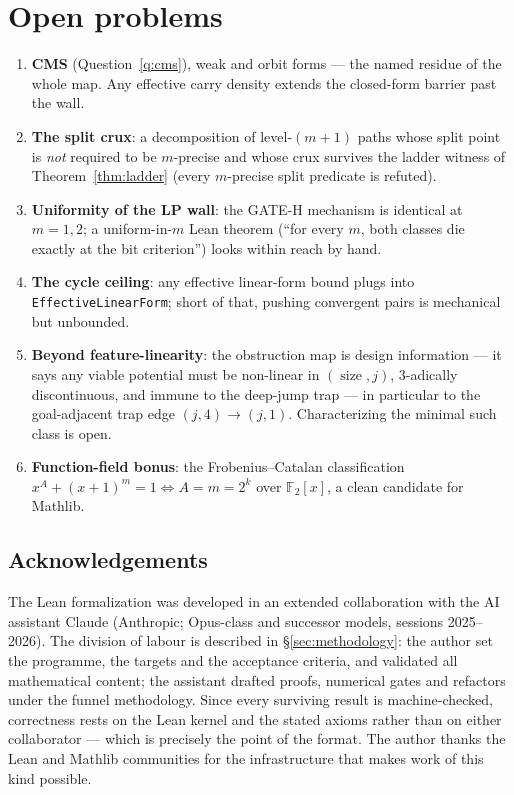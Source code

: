 \documentclass[11pt]{amsart}
\theoremstyle{definition}
\theoremstyle{remark}
\newcommand{\size}{\operatorname{size}}
\newcommand{\lean}[1]{{\def\_{\textunderscore\allowbreak}\texttt{#1}}}
\newcommand{\F}{\mathbb{F}}
\begin{document}
\section{Open problems}\label{sec:open}

\begin{enumerate}
\item \textbf{CMS} (Question~\ref{q:cms}), weak and orbit forms --- the
  named residue of the whole map.  Any effective carry density extends the
  closed-form barrier past the wall.
\item \textbf{The split crux}: a decomposition of level-$(m{+}1)$ paths
  whose split point is \emph{not} required to be $m$-precise and whose crux
  survives the ladder witness of Theorem~\ref{thm:ladder} (every
  $m$-precise split predicate is refuted).
\item \textbf{Uniformity of the LP wall}: the GATE-H mechanism is identical
  at $m=1,2$; a uniform-in-$m$ Lean theorem (``for every $m$, both classes
  die exactly at the bit criterion'') looks within reach by hand.
\item \textbf{The cycle ceiling}: any effective linear-form bound plugs into
  \lean{EffectiveLinearForm}; short of that, pushing convergent pairs is
  mechanical but unbounded.
\item \textbf{Beyond feature-linearity}: the obstruction map is design
  information --- it says any viable potential must be non-linear in
  $(\size, j)$, $3$-adically discontinuous, and immune to the deep-jump
  trap --- in particular to the goal-adjacent trap edge $(j,4)\to(j,1)$.
  Characterizing the minimal such class is open.
\item \textbf{Function-field bonus}: the Frobenius--Catalan classification
  $x^A + (x+1)^m = 1 \iff A = m = 2^k$ over $\F_2[x]$, a clean candidate for
  Mathlib.
\end{enumerate}

\subsection*{Acknowledgements}
The Lean formalization was developed in an extended collaboration with the
AI assistant Claude (Anthropic; Opus-class and successor models, sessions
2025--2026).  The division of labour is described in
\S\ref{sec:methodology}: the author set the programme, the targets and the
acceptance criteria, and validated all mathematical content; the assistant
drafted proofs, numerical gates and refactors under the funnel methodology.
Since every surviving result is machine-checked, correctness rests on the
Lean kernel and the stated axioms rather than on either collaborator ---
which is precisely the point of the format.  The author thanks the Lean and
Mathlib communities for the infrastructure that makes work of this kind
possible.
\end{document}
